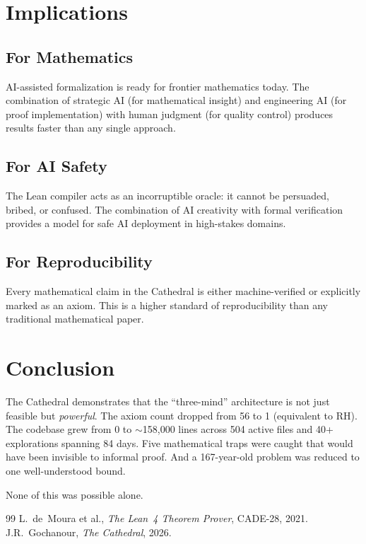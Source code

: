 \documentclass[11pt,a4paper]{article}
\begin{document}
\section{Implications}

\subsection{For Mathematics}

AI-assisted formalization is ready for frontier mathematics today.
The combination of strategic AI (for mathematical insight) and
engineering AI (for proof implementation) with human judgment
(for quality control) produces results faster than any single
approach.

\subsection{For AI Safety}

The Lean compiler acts as an incorruptible oracle: it cannot be
persuaded, bribed, or confused. The combination of AI creativity
with formal verification provides a model for safe AI deployment
in high-stakes domains.

\subsection{For Reproducibility}

Every mathematical claim in the Cathedral is either machine-verified
or explicitly marked as an axiom. This is a higher standard of
reproducibility than any traditional mathematical paper.

\section{Conclusion}

The Cathedral demonstrates that the ``three-mind'' architecture is
not just feasible but \emph{powerful}. The axiom count dropped from
56 to 1 (equivalent to RH). The codebase grew from
0 to $\sim$158{,}000 lines across 504 active files and 40+ explorations
spanning 84 days. Five mathematical traps were caught that would have
been invisible to informal proof. And a 167-year-old problem was
reduced to one well-understood bound.

None of this was possible alone.

\begin{thebibliography}{99}
L.~de~Moura et al., \emph{The Lean~4 Theorem Prover}, CADE-28, 2021.
J.R.~Gochanour, \emph{The Cathedral}, 2026.
\end{thebibliography}
\end{document}
